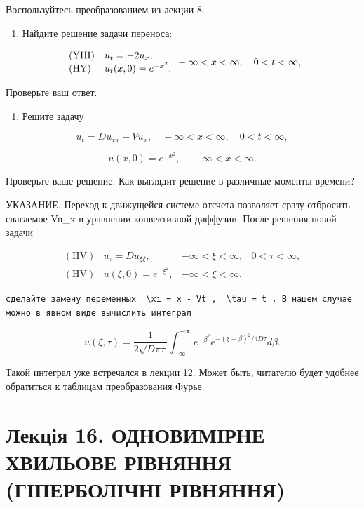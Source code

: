 \documentclass[
  ukrainian,
]{article}
\providecommand{\tightlist}{%
  \setlength{\itemsep}{0pt}\setlength{\parskip}{0pt}}
\begin{document}
Воспользуйтесь преобразованием из лекции 8.

\begin{enumerate}
\def\labelenumi{\arabic{enumi}.}
\setcounter{enumi}{2}
\tightlist
\item
  Найдите решение задачи переноса:
\end{enumerate}

\[
\begin{array}{ll} (\text{YHI}) & u_t = -2u_x, \\ (\text{HY}) & u_t(x, 0) = e^{-x^2}. \end{array} \\ -\infty < x < \infty, \quad 0 < t < \infty,
\]

Проверьте ваш ответ.

\begin{enumerate}
\def\labelenumi{\arabic{enumi}.}
\setcounter{enumi}{3}
\tightlist
\item
  Решите задачу
\end{enumerate}

\[
u_t = Du_{xx} - Vu_x, \quad -\infty < x < \infty, \quad 0 < t < \infty,
\]

\[
u(x, 0) = e^{-x^2}, \quad -\infty < x < \infty.
\]

Проверьте ваше решение. Как выглядит решение в различные моменты
времени?

УКАЗАНИЕ. Переход к движущейся системе отсчета позволяет сразу отбросить
слагаемое Vu\_x в уравнении конвективной диффузии. После решения новой
задачи

\[
\begin{array}{ll} (\text{HV}) & u_{\tau} = Du_{\xi\xi}, & -\infty < \xi < \infty, & 0 < \tau < \infty, \\ (\text{HV}) & u(\xi, 0) = e^{-\xi^2}, & -\infty < \xi < \infty, \end{array}
\]

\begin{verbatim}
сделайте замену переменных  \xi = x - Vt ,  \tau = t . В нашем случае можно в явном виде вычислить интеграл
\end{verbatim}

\[
u(\xi, \tau) = \frac{1}{2\sqrt{D\pi\tau}} \int_{-\infty}^{+\infty} e^{-\beta^2} e^{-(\xi-\beta)^2/4D\tau} d\beta.
\]

Такой интеграл уже встречался в лекции 12. Может быть, читателю будет
удобнее обратиться к таблицам преобразования Фурье.

\section{Лекція 16. ОДНОВИМІРНЕ ХВИЛЬОВЕ РІВНЯННЯ (ГІПЕРБОЛІЧНІ
РІВНЯННЯ)}\label{ux43bux435ux43aux446ux456ux44f-16.-ux43eux434ux43dux43eux432ux438ux43cux456ux440ux43dux435-ux445ux432ux438ux43bux44cux43eux432ux435-ux440ux456ux432ux43dux44fux43dux43dux44f-ux433ux456ux43fux435ux440ux431ux43eux43bux456ux447ux43dux456-ux440ux456ux432ux43dux44fux43dux43dux44f}
\end{document}
